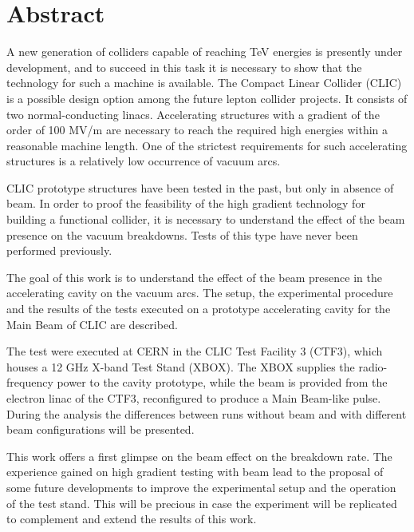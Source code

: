 \chapter*{Abstract}

A new generation of colliders capable of reaching TeV energies is presently under development, and to succeed in this task it is necessary to show that the technology for such a machine is available. The Compact Linear Collider (CLIC) is a possible design option among the future lepton collider projects. It consists of two normal-conducting linacs. Accelerating structures with a gradient of the order of 100 MV/m are necessary to reach the required high energies within a reasonable machine length. One of the strictest requirements for such accelerating structures is a relatively low occurrence of vacuum arcs. 

CLIC prototype structures have been tested in the past, but only in absence of beam. In order to proof the feasibility of the high gradient technology for building a functional collider, it is necessary to understand the effect of the beam presence on the vacuum breakdowns. Tests of this type have never been performed previously. 

The goal of this work is to understand the effect of the beam presence in the accelerating cavity on the vacuum arcs. The setup, the experimental procedure and the results of the tests executed on a prototype accelerating cavity for the Main Beam of CLIC are described. 

The test were executed at CERN in the CLIC Test Facility 3 (CTF3), which houses a 12 GHz X-band Test Stand (XBOX). The XBOX supplies the radio-frequency power to the cavity prototype, while the beam is provided from the electron linac of the CTF3, reconfigured to produce a Main Beam-like pulse. 
During the analysis the differences between runs without beam and with different beam configurations will be presented.

This work offers a first glimpse on the beam effect on the breakdown rate. The experience gained on high gradient testing with beam lead to the proposal of some future developments to improve the experimental setup and the operation of the test stand. This will be precious in case the experiment will be replicated to complement and extend the results of this work. 